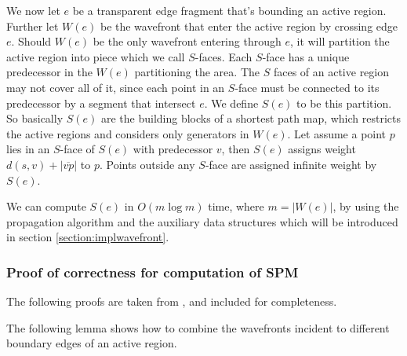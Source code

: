 We now let $e$ be a transparent edge fragment that's bounding an active region. Further let $W(e)$ be 
the wavefront that enter the active region by crossing edge $e$. Should $W(e)$ be the only wavefront 
entering through $e$, it will partition the active region into piece which we call $S$-faces. Each 
$S$-face has a unique predecessor in the $W(e)$ partitioning the area. The $S$ faces of an active 
region may not cover all of it, since each point in an $S$-face must be connected to its predecessor 
by a segment that intersect $e$. We define $S(e)$ to be this partition. So basically $S(e)$ are the 
building blocks of a shortest path map, which restricts the active regions and considers only 
generators in $W(e)$. Let assume a point $p$ lies in an $S$-face of $S(e)$ with predecessor $v$, then 
$S(e)$ assigns weight $d(s,v) + |\overline{vp}|$ to $p$. Points outside any $S$-face are assigned 
infinite weight by $S(e)$.

We can compute $S(e)$ in $O(m\log m)$ time, where $m = |W(e)|$, by using the propagation algorithm and 
the auxiliary data structures which will be introduced in section \ref{section:implwavefront}.

\subsubsection{Proof of correctness for computation of SPM}

The following proofs are taken from \cite{HershbergerS99}, and included for completeness.

The following lemma shows how to combine the wavefronts incident to different
boundary edges of an active region.

